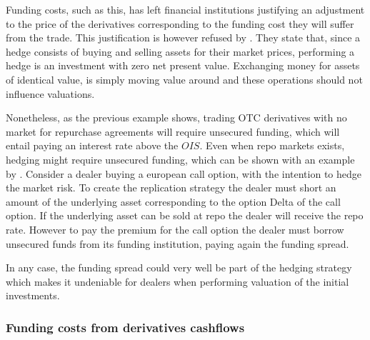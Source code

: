 \documentclass[../main.tex]{subfiles}
\begin{document}
        Funding costs, such as this, has left financial institutions justifying an adjustment to the price of the derivatives corresponding to the funding cost they will suffer from the trade. This justification is however refused by \cite{HullWhite2012FVA}. They state that, since a hedge consists of buying and selling assets for their market prices, performing a hedge is an investment with zero net present value. Exchanging money for assets of identical value, is simply moving value around and these operations should not influence valuations. 

        Nonetheless, as the previous example shows, trading OTC derivatives with no market for repurchase agreements will require unsecured funding, which will entail paying an interest rate above the $OIS$. Even when repo markets exists, hedging might require unsecured funding, which can be shown with an example by \cite{Castagna2012FVA}. Consider a dealer buying a european call option, with the intention to hedge the market risk. To create the replication strategy the dealer must short an amount of the underlying asset corresponding to the option Delta of the call option. If the underlying asset can be sold at repo the dealer will receive the repo rate. However to pay the premium for the call option the dealer must borrow unsecured funds from its funding institution, paying again the funding spread. 

        In any case, the funding spread could very well be part of the hedging strategy which makes it undeniable for dealers when performing valuation of the initial investments.
        
    \subsubsection{Funding costs from derivatives cashflows}
\end{document}

